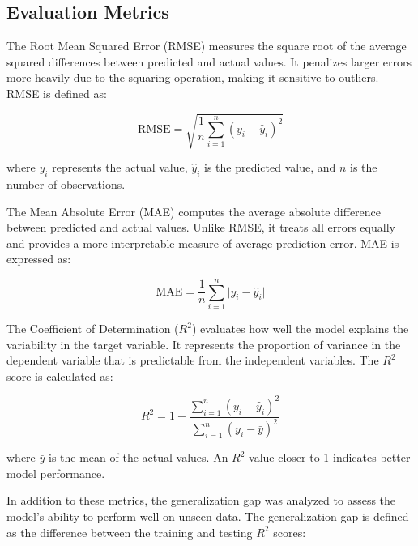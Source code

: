 \documentclass[conference]{IEEEtran}
\begin{document}
\subsection{Evaluation Metrics}

The Root Mean Squared Error (RMSE) measures the square root of the average squared differences between predicted and actual values. It penalizes larger errors more heavily due to the squaring operation, making it sensitive to outliers. RMSE is defined as: 

\begin{equation}
\text{RMSE} = \sqrt{\frac{1}{n} \sum_{i=1}^{n} (y_i - \hat{y}_i)^2}
\end{equation}

where $y_i$ represents the actual value, $\hat{y}_i$ is the predicted value, and $n$ is the number of observations.

\vspace{0.3cm}

The Mean Absolute Error (MAE) computes the average absolute difference between predicted and actual values. Unlike RMSE, it treats all errors equally and provides a more interpretable measure of average prediction error. MAE is expressed as:

\begin{equation}
\text{MAE} = \frac{1}{n} \sum_{i=1}^{n} \lvert y_i - \hat{y}_i \rvert
\end{equation}

\vspace{0.3cm}

The Coefficient of Determination ($R^2$) evaluates how well the model explains the variability in the target variable. It represents the proportion of variance in the dependent variable that is predictable from the independent variables. The $R^2$ score is calculated as:

\begin{equation}
R^2 = 1 - \frac{\sum_{i=1}^{n} (y_i - \hat{y}_i)^2}{\sum_{i=1}^{n} (y_i - \bar{y})^2}
\end{equation}

where $\bar{y}$ is the mean of the actual values. An $R^2$ value closer to 1 indicates better model performance.

\vspace{0.3cm}

In addition to these metrics, the generalization gap was analyzed to assess the model’s ability to perform well on unseen data. The generalization gap is defined as the difference between the training and testing $R^2$ scores:
\end{document}
